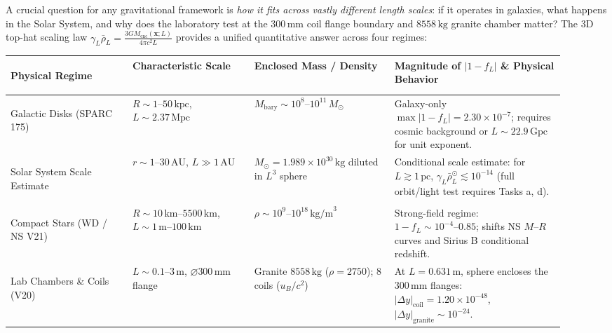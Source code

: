 \documentclass[10pt,a4paper]{article}
\begin{document}
\par
A crucial question for any gravitational framework is \emph{how it fits across vastly different length scales}: if it operates in galaxies, what happens in the Solar System, and why does the laboratory test at the $300\,\text{mm}$ coil flange boundary and $8558\,\text{kg}$ granite chamber matter? The 3D top-hat scaling law $\gamma_L \bar{\rho}_L = \frac{3 G M_{\text{enc}}(\mathbf{x};L)}{4\pi c^2 L}$ provides a unified quantitative answer across four regimes:
\begin{center}\vspace{-2pt}
{\footnotesize
\begin{tabular}{@{}>{\bfseries\raggedright\arraybackslash}p{0.20\linewidth}>{\raggedright\arraybackslash}p{0.20\linewidth}>{\raggedright\arraybackslash}p{0.23\linewidth}>{\raggedright\arraybackslash}p{0.29\linewidth}@{}}
\toprule
Physical Regime & Characteristic Scale & Enclosed Mass / Density & Magnitude of $|1 - f_L|$ \& Physical Behavior \\
\midrule
Galactic Disks (SPARC 175) & $R \sim 1\text{--}50\,\text{kpc}$, $L \sim 2.37\,\text{Mpc}$ & $M_{\text{bary}} \sim 10^8\text{--}10^{11}\,M_\odot$ & Galaxy-only $\max|1-f_L| = 2.30\times 10^{-7}$; requires cosmic background or $L\sim 22.9\,\text{Gpc}$ for unit exponent. \\
Solar System Scale Estimate & $r \sim 1\text{--}30\,\text{AU}$, $L \gg 1\,\text{AU}$ & $M_\odot = 1.989\times 10^{30}\,\text{kg}$ diluted in $L^3$ sphere & Conditional scale estimate: for $L \gtrsim 1\,\text{pc}$, $\gamma_L\bar{\rho}_L^\odot \lesssim 10^{-14}$ (full orbit/light test requires Tasks a, d). \\
Compact Stars (WD / NS V21) & $R \sim 10\,\text{km}\text{--}5500\,\text{km}$, $L \sim 1\,\text{m}\text{--}100\,\text{km}$ & $\rho \sim 10^9\text{--}10^{18}\,\text{kg/m}^3$ & Strong-field regime: $1-f_L \sim 10^{-4}\text{--}0.85$; shifts NS $M$--$R$ curves and Sirius B conditional redshift. \\
Lab Chambers \& Coils (V20) & $L \sim 0.1\text{--}3\,\text{m}$, $\varnothing 300\,\text{mm}$ flange & Granite $8558\,\text{kg}$ ($\rho=2750$); 8 coils ($u_B/c^2$) & At $L=0.631\,\text{m}$, sphere encloses the $300\,\text{mm}$ flanges: $|\Delta y|_{\text{coil}}=1.20\times 10^{-48}$, $|\Delta y|_{\text{granite}}\sim 10^{-24}$. \\
\bottomrule
\end{tabular}}
\end{center}
\end{document}
